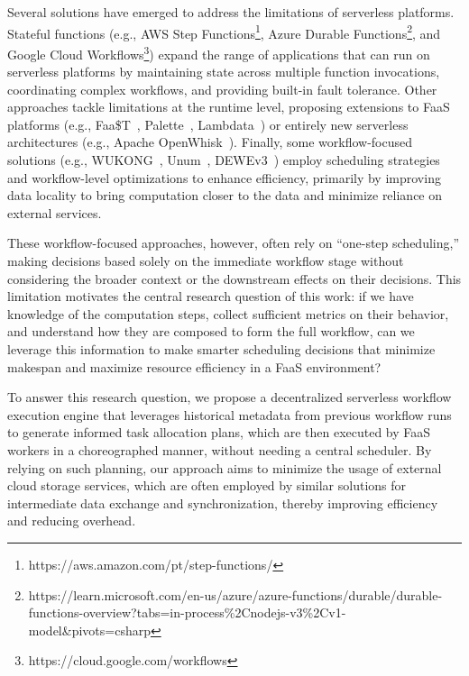 \documentclass[conference]{IEEEtran}
\begin{document}
Several solutions have emerged to address the limitations of serverless platforms. Stateful functions (e.g., AWS Step Functions\footnote{\label{fn:aws-step-functions}https://aws.amazon.com/pt/step-functions/}, Azure Durable Functions\footnote{\label{fn:azure-durable-functions}https://learn.microsoft.com/en-us/azure/azure-functions/durable/durable-functions-overview?tabs=in-process\%2Cnodejs-v3\%2Cv1-model\&pivots=csharp}, and Google Cloud Workflows\footnote{\label{fn:google-cloud-workflows}https://cloud.google.com/workflows}) expand the range of applications that can run on serverless platforms by maintaining state across multiple function invocations, coordinating complex workflows, and providing built-in fault tolerance. Other approaches tackle limitations at the runtime level, proposing extensions to FaaS platforms (e.g., Faa\$T~\cite{faast_caching}, Palette~\cite{palette_load_balancing}, Lambdata~\cite{lambdata_intents}) or entirely new serverless architectures (e.g., Apache OpenWhisk~\cite{open_whisk}). Finally, some workflow-focused solutions (e.g., WUKONG~\cite{wukong_2}, Unum~\cite{unum_decentralized_orchestrator}, DEWEv3~\cite{dewe_v3}) employ scheduling strategies and workflow-level optimizations to enhance efficiency, primarily by improving data locality to bring computation closer to the data and minimize reliance on external services.

These workflow-focused approaches, however, often rely on “one-step scheduling,” making decisions based solely on the immediate workflow stage without considering the broader context or the downstream effects on their decisions. This limitation motivates the central research question of this work: if we have knowledge of the computation steps, collect sufficient metrics on their behavior, and understand how they are composed to form the full workflow, can we leverage this information to make smarter scheduling decisions that minimize makespan and maximize resource efficiency in a FaaS environment?

To answer this research question, we propose a decentralized serverless workflow execution engine that leverages historical metadata from previous workflow runs to generate informed task allocation plans, which are then executed by FaaS workers in a choreographed manner, without needing a central scheduler. By relying on such planning, our approach aims to minimize the usage of external cloud storage services, which are often employed by similar solutions for intermediate data exchange and synchronization, thereby improving efficiency and reducing overhead.
\end{document}
